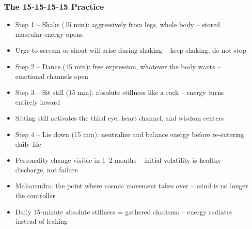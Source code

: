 \begin{frame}[fragile]\frametitle{The 15-15-15-15 Practice}
  \begin{itemize}
    \item Step 1 -- Shake (15 min): aggressively from legs, whole body -- stored muscular energy opens
    \item Urge to scream or shout will arise during shaking -- keep shaking, do not stop
    \item Step 2 -- Dance (15 min): free expression, whatever the body wants -- emotional channels open
    \item Step 3 -- Sit still (15 min): absolute stillness like a rock -- energy turns entirely inward
    \item Sitting still activates the third eye, heart channel, and wisdom centers
    \item Step 4 -- Lie down (15 min): neutralize and balance energy before re-entering daily life
    \item Personality change visible in 1--2 months -- initial volatility is healthy discharge, not failure
    \item Mahamudra: the point where cosmic movement takes over -- mind is no longer the controller
    \item Daily 15-minute absolute stillness = gathered charisma -- energy radiates instead of leaking
  \end{itemize}
\end{frame}

